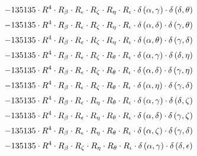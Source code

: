 \begin{subequations}
\begin{gather}
 \\[0.2em] \notag 		 - 135135 \cdot R^{4} \cdot R_{\beta{}} \cdot R_{\epsilon{}} \cdot R_{\zeta{}} \cdot R_{\eta{}} \cdot R_{\iota{}} \cdot \delta{}\left(\alpha{}, \gamma{}\right) \cdot \delta{}\left(\delta{}, \theta{}\right) 
 \\[0.2em] \notag 		 - 135135 \cdot R^{4} \cdot R_{\beta{}} \cdot R_{\epsilon{}} \cdot R_{\zeta{}} \cdot R_{\eta{}} \cdot R_{\iota{}} \cdot \delta{}\left(\alpha{}, \delta{}\right) \cdot \delta{}\left(\gamma{}, \theta{}\right) 
 \\[0.2em] \notag 		 - 135135 \cdot R^{4} \cdot R_{\beta{}} \cdot R_{\epsilon{}} \cdot R_{\zeta{}} \cdot R_{\eta{}} \cdot R_{\iota{}} \cdot \delta{}\left(\alpha{}, \theta{}\right) \cdot \delta{}\left(\gamma{}, \delta{}\right) 
 \\[0.2em] \notag 		 - 135135 \cdot R^{4} \cdot R_{\beta{}} \cdot R_{\epsilon{}} \cdot R_{\zeta{}} \cdot R_{\theta{}} \cdot R_{\iota{}} \cdot \delta{}\left(\alpha{}, \gamma{}\right) \cdot \delta{}\left(\delta{}, \eta{}\right) 
 \\[0.2em] \notag 		 - 135135 \cdot R^{4} \cdot R_{\beta{}} \cdot R_{\epsilon{}} \cdot R_{\zeta{}} \cdot R_{\theta{}} \cdot R_{\iota{}} \cdot \delta{}\left(\alpha{}, \delta{}\right) \cdot \delta{}\left(\gamma{}, \eta{}\right) 
 \\[0.2em] \notag 		 - 135135 \cdot R^{4} \cdot R_{\beta{}} \cdot R_{\epsilon{}} \cdot R_{\zeta{}} \cdot R_{\theta{}} \cdot R_{\iota{}} \cdot \delta{}\left(\alpha{}, \eta{}\right) \cdot \delta{}\left(\gamma{}, \delta{}\right) 
 \\[0.2em] \notag 		 - 135135 \cdot R^{4} \cdot R_{\beta{}} \cdot R_{\epsilon{}} \cdot R_{\eta{}} \cdot R_{\theta{}} \cdot R_{\iota{}} \cdot \delta{}\left(\alpha{}, \gamma{}\right) \cdot \delta{}\left(\delta{}, \zeta{}\right) 
 \\[0.2em] \notag 		 - 135135 \cdot R^{4} \cdot R_{\beta{}} \cdot R_{\epsilon{}} \cdot R_{\eta{}} \cdot R_{\theta{}} \cdot R_{\iota{}} \cdot \delta{}\left(\alpha{}, \delta{}\right) \cdot \delta{}\left(\gamma{}, \zeta{}\right) 
 \\[0.2em] \notag 		 - 135135 \cdot R^{4} \cdot R_{\beta{}} \cdot R_{\epsilon{}} \cdot R_{\eta{}} \cdot R_{\theta{}} \cdot R_{\iota{}} \cdot \delta{}\left(\alpha{}, \zeta{}\right) \cdot \delta{}\left(\gamma{}, \delta{}\right) 
 \\[0.2em] \notag 		 - 135135 \cdot R^{4} \cdot R_{\beta{}} \cdot R_{\zeta{}} \cdot R_{\eta{}} \cdot R_{\theta{}} \cdot R_{\iota{}} \cdot \delta{}\left(\alpha{}, \gamma{}\right) \cdot \delta{}\left(\delta{}, \epsilon{}\right) 

\end{gather}
\end{subequations}
